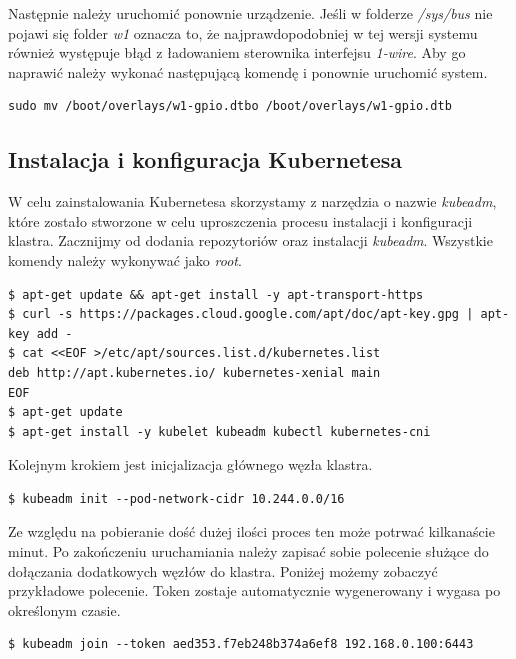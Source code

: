 \documentclass[12pt]{report}
\let\Oldsubsection\subsection
\renewcommand{\subsection}{\FloatBarrier\Oldsubsection}
\begin{document}
{Następnie należy uruchomić ponownie urządzenie. Jeśli w folderze \textit{/sys/bus} nie pojawi się folder \textit{w1} oznacza to, że najprawdopodobniej w tej wersji systemu również występuje błąd z ładowaniem sterownika interfejsu \textit{1-wire}. Aby go naprawić należy wykonać następującą komendę i ponownie uruchomić system.

\begin{lstlisting}
sudo mv /boot/overlays/w1-gpio.dtbo	/boot/overlays/w1-gpio.dtb
\end{lstlisting}

\subsection{Instalacja i konfiguracja Kubernetesa} \label{subsect:kubernetes-install}
W celu zainstalowania Kubernetesa skorzystamy z narzędzia o nazwie \textit{kubeadm}, które zostało stworzone w celu uproszczenia procesu instalacji i konfiguracji klastra. Zacznijmy od dodania repozytoriów oraz instalacji \textit{kubeadm}. Wszystkie komendy należy wykonywać jako \textit{root}. \\

\begin{lstlisting}
$ apt-get update && apt-get install -y apt-transport-https
$ curl -s https://packages.cloud.google.com/apt/doc/apt-key.gpg | apt-key add -
$ cat <<EOF >/etc/apt/sources.list.d/kubernetes.list
deb http://apt.kubernetes.io/ kubernetes-xenial main
EOF
$ apt-get update
$ apt-get install -y kubelet kubeadm kubectl kubernetes-cni
\end{lstlisting}

\noindent Kolejnym krokiem jest inicjalizacja głównego węzła klastra. \\

\begin{lstlisting}
$ kubeadm init --pod-network-cidr 10.244.0.0/16
\end{lstlisting}

Ze względu na pobieranie dość dużej ilości proces ten może potrwać kilkanaście minut. Po zakończeniu uruchamiania należy zapisać sobie polecenie służące do dołączania dodatkowych węzłów do klastra. Poniżej możemy zobaczyć przykładowe polecenie. Token zostaje automatycznie wygenerowany i wygasa po określonym czasie.

\begin{lstlisting}
$ kubeadm join --token aed353.f7eb248b374a6ef8 192.168.0.100:6443
\end{lstlisting}

}
\end{document}
